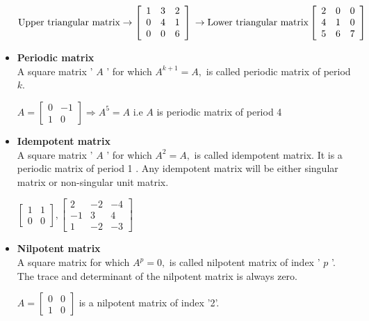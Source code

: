 \begin{itemize}
	\begin{example}
		 $\text{Upper triangular matrix}\rightarrow
	 \left[\begin{array}{lll}
	 	1 & 3 & 2 \\
	 	0 & 4 & 1 \\
	 	0 & 0 & 6
	 \end{array}\right]\\ \rightarrow\text{Lower triangular matrix}\left[\begin{array}{lll}
	 	2 & 0 & 0 \\
	 	4 & 1 & 0 \\
	 	5 & 6 & 7
	 \end{array}\right]
	 $
	\end{example}
	 \item \textbf{ Periodic matrix}\\
	  A square matrix ' $A$ ' for which $A^{k+1}=A,$ is called periodic matrix of period $k$.
	 \begin{example}
	 	 $A=\left[\begin{array}{cc}0 & -1 \\ 1 & 0\end{array}\right] \Rightarrow A^{5}=A$ i.e $A$ is periodic matrix of period 4
	 \end{example}
	 \item \textbf{ Idempotent matrix}\\
	 A square matrix ' $A$ ' for which $A^{2}=A,$ is called idempotent matrix. It is a periodic matrix of period 1 . Any idempotent matrix will be either singular matrix or non-singular unit matrix.
	\begin{example}
		 $\left[\begin{array}{ll}1 & 1 \\ 0 & 0\end{array}\right],\left[\begin{array}{ccc}2 & -2 & -4 \\ -1 & 3 & 4 \\ 1 & -2 & -3\end{array}\right]$
	\end{example}
	 \item \textbf{Nilpotent matrix}\\
	  A square matrix for which $A^{p}=0,$ is called nilpotent matrix of index ' $p$ '. The trace and determinant of the nilpotent matrix is always zero.
	\begin{example}
		 $A=\left[\begin{array}{ll}0 & 0 \\ 1 & 0\end{array}\right]$ is a nilpotent matrix of index '2'.

\end{example}
\end{itemize}
